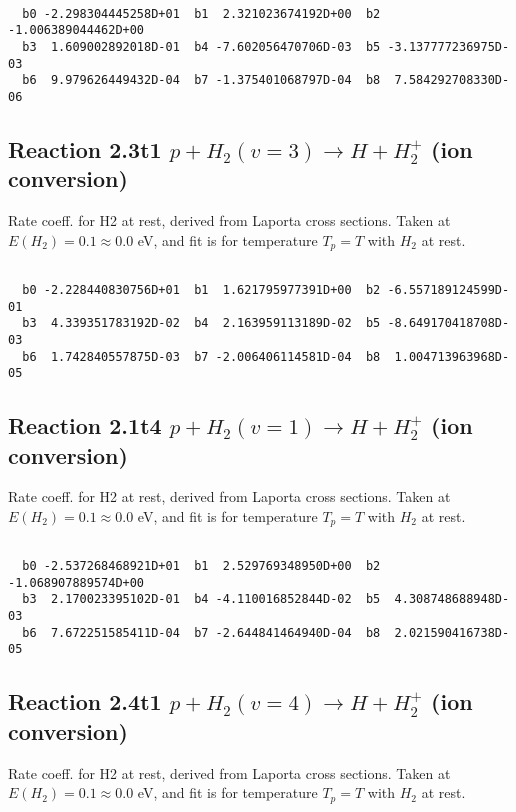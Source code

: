 \begin{small}\begin{verbatim}

  b0 -2.298304445258D+01  b1  2.321023674192D+00  b2 -1.006389044462D+00
  b3  1.609002892018D-01  b4 -7.602056470706D-03  b5 -3.137777236975D-03
  b6  9.979626449432D-04  b7 -1.375401068797D-04  b8  7.584292708330D-06

\end{verbatim}\end{small}

\newpage
\subsection{
Reaction 2.3t1
$ p + H_2(v=3) \rightarrow H + H_2^+$ (ion conversion)
}
Rate coeff. for H2 at rest, derived from Laporta cross sections.
Taken at $E(H_2) = 0.1 \approx 0.0$ eV,  and fit is for temperature $T_p=T$ with $H_2$ at rest.

\begin{small}\begin{verbatim}

  b0 -2.228440830756D+01  b1  1.621795977391D+00  b2 -6.557189124599D-01
  b3  4.339351783192D-02  b4  2.163959113189D-02  b5 -8.649170418708D-03
  b6  1.742840557875D-03  b7 -2.006406114581D-04  b8  1.004713963968D-05

\end{verbatim}\end{small}

\newpage
\subsection{
Reaction 2.1t4
$ p + H_2(v=1) \rightarrow H + H_2^+$ (ion conversion)
}
Rate coeff. for H2 at rest, derived from Laporta cross sections.
Taken at $E(H_2) = 0.1 \approx 0.0$ eV,  and fit is for temperature $T_p=T$ with $H_2$ at rest.

\begin{small}\begin{verbatim}

  b0 -2.537268468921D+01  b1  2.529769348950D+00  b2 -1.068907889574D+00
  b3  2.170023395102D-01  b4 -4.110016852844D-02  b5  4.308748688948D-03
  b6  7.672251585411D-04  b7 -2.644841464940D-04  b8  2.021590416738D-05

\end{verbatim}\end{small}

\newpage
\subsection{
Reaction 2.4t1
$ p + H_2(v=4) \rightarrow H + H_2^+$ (ion conversion)
}
Rate coeff. for H2 at rest, derived from Laporta cross sections.
Taken at $E(H_2) = 0.1 \approx 0.0$ eV,  and fit is for temperature $T_p=T$ with $H_2$ at rest.

